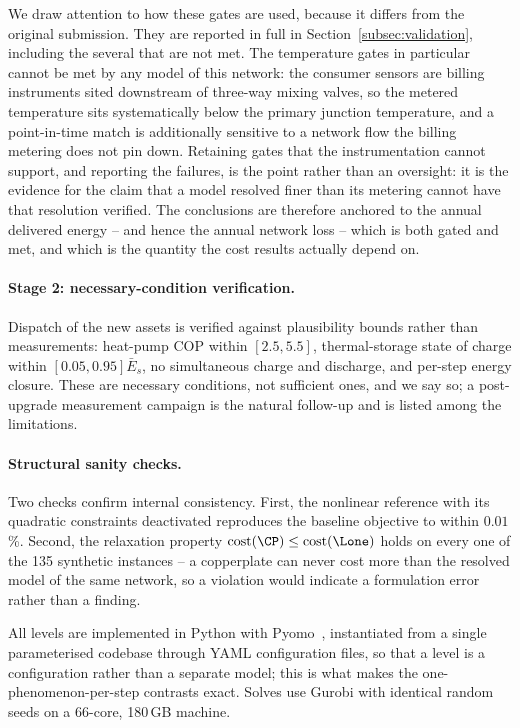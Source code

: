 We draw attention to how these gates are used, because it differs from the original
submission. They are reported in full in Section~\ref{subsec:validation}, including the
several that are not met. The temperature gates in particular cannot be met by any model
of this network: the consumer sensors are billing instruments sited downstream of
three-way mixing valves, so the metered temperature sits systematically below the primary
junction temperature, and a point-in-time match is additionally sensitive to a network flow
the billing metering does not pin down. Retaining gates that the instrumentation cannot
support, and reporting the failures, is the point rather than an oversight: it is the
evidence for the claim that a model resolved finer than its metering cannot have that
resolution verified. The conclusions are therefore anchored to the annual delivered energy
-- and hence the annual network loss -- which is both gated and met, and which is the
quantity the cost results actually depend on.

\paragraph{Stage 2: necessary-condition verification.}
Dispatch of the new assets is verified against plausibility bounds rather than
measurements: heat-pump COP within $[2.5, 5.5]$, thermal-storage state of charge within
$[0.05, 0.95]\bar{E}_s$, no simultaneous charge and discharge, and per-step energy
closure. These are necessary conditions, not sufficient ones, and we say so; a
post-upgrade measurement campaign is the natural follow-up and is listed among the
limitations.

\paragraph{Structural sanity checks.}
Two checks confirm internal consistency. First, the nonlinear reference with its quadratic
constraints deactivated reproduces the baseline objective to within $0.01$\,\%. Second, the
relaxation property $\mathrm{cost}(\CP) \le \mathrm{cost}(\Lone)$ holds on every one of the
135 synthetic instances -- a copperplate can never cost more than the resolved model of the
same network, so a violation would indicate a formulation error rather than a finding.


All levels are implemented in Python with Pyomo~\cite{pyomo}, instantiated from a single
parameterised codebase through YAML configuration files, so that a level is a
configuration rather than a separate model; this is what makes the one-phenomenon-per-step
contrasts exact. Solves use Gurobi with identical random seeds on a 66-core, 180\,GB
machine.

